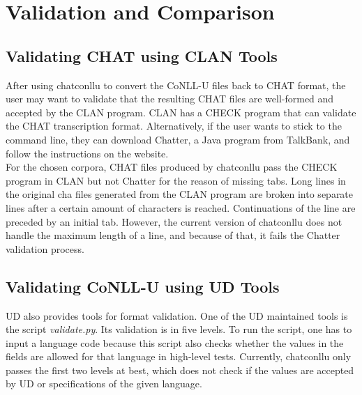 \chapter{Validation and Comparison} %

\label{Chapter5} %

\section{Validating CHAT using CLAN Tools}

After using chatconllu to convert the CoNLL-U files back to CHAT format, the user may want to validate that the resulting CHAT files are well-formed and accepted by the CLAN program. CLAN has a CHECK program that can validate the CHAT transcription format. Alternatively, if the user wants to stick to the command line, they can download Chatter, a Java program from TalkBank, and follow the instructions on the website.\\

For the chosen corpora, CHAT files produced by chatconllu pass the CHECK program in CLAN but not Chatter for the reason of missing tabs. Long lines in the original cha files generated from the CLAN program are broken into separate lines after a certain amount of characters is reached. Continuations of the line are preceded by an initial tab. However, the current version of chatconllu does not handle the maximum length of a line, and because of that, it fails the Chatter validation process.
\vspace{-0.4em}
\section{Validating CoNLL-U using UD Tools}

UD also provides tools for format validation. One of the UD maintained tools is the script \emph{validate.py}. Its validation is in five levels. To run the script, one has to input a language code because this script also checks whether the values in the fields are allowed for that language in high-level tests. Currently, chatconllu only passes the first two levels at best, which does not check if the values are accepted by UD or specifications of the given language.
\vspace{-0.4em}
